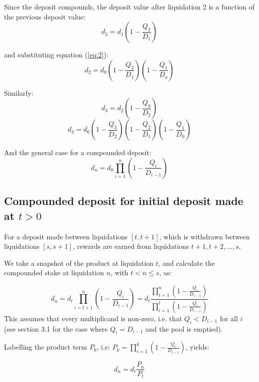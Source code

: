 \documentclass[reqno]{article}
\begin{document}
\bigskip
Since the deposit compounds, the deposit value after liquidation 2 is a function of the previous deposit value:
\begin{equation} 
    d_2=d_1\left(1-\frac{Q_2}{D_1}\right)
\end{equation}

\bigskip
and substituting equation (\ref{eq:2}):
\begin{equation} 
    d_2=d_0 \left(1-\frac{Q_2}{D_1}\right) \left(1-\frac{Q_1}{D_o} \right)
\end{equation}

\bigskip
Similarly:
\begin{equation} 
    d_3=d_2\left(1-\frac{Q_3}{D_2}\right)
\end{equation}
\begin{equation} 
    d_3=d_0\left(1-\frac{Q_3}{D_2}\right)\left(1-\frac{Q_2}{D_1}\right)\left(1-\frac{Q_1}{D_0}\right)
\end{equation}

\bigskip
And the general case for a compounded deposit:
\begin{equation} \label{eq:8}
    d_n=d_0\prod^n_{i=1}{\left(1-\frac{Q_i}{D_{i-1}}\right)}
\end{equation}
\subsection{Compounded deposit for initial deposit made at $t>0$}
For a deposit made between liquidations $[t, t+1]$, which is withdrawn between liquidations $[s, s+1]$, rewards are earned from liquidations $t+1, t+2, \ldots, s$.

We take a snapshot of the product at liquidation $t$, and calculate the compounded stake at liquidation $n$, with $t < n \leq s$, as:

\begin{equation} 
    d_n=d_t\prod^n_{i=t+1}{\left(1-\frac{Q_i}{D_{i-1}}\right)}=d_t\frac{\displaystyle\prod^n_{i=1}{\left(1-\frac{Q_i}{D_{i-1}}\right)}}{\displaystyle\prod^t_{i=1}\left(1-\frac{Q_i}{D_{i-1}}\right)}
\end{equation}
This assumes that every multiplicand is non-zero, i.e. that $Q_i < D_{i-1}$ for all $i$ (see section 3.1 for the case where $Q_i = D_{i-1}$ and the pool is emptied).

\bigskip
Labelling the product term $P_k$, i.e: $P_k = \displaystyle\prod^k_{i=1}{\left(1-\frac{Q_i}{D_{i-1}}\right)}$, yields:

\begin{equation} \label{eq:10}
d_n=d_t\frac{P_n}{P_t}
\end{equation}
\end{document}
